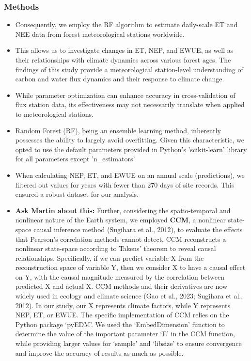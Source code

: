\documentclass[paper=a4, fontsize=12pt]{scrartcl}
\begin{document}
	\subsubsection{Methods}
	\begin{itemize}
		\item Consequently, we employ the RF algorithm to estimate daily-scale ET and NEE data from forest meteorological stations worldwide.
		\item This allows us to investigate changes in ET, NEP, and EWUE, as well as their relationships with climate dynamics across various forest ages. The findings of this study provide a meteorological station-level understanding of carbon and water flux dynamics and their response to climate change.
		\item While parameter optimization can enhance accuracy in cross-validation of flux station data, its effectiveness may not necessarily translate when applied to meteorological stations. 
		\item Random Forest (RF), being an ensemble learning method, inherently possesses the ability to largely avoid overfitting. Given this characteristic, we opted to use the default parameters provided in Python’s ’scikit-learn’ library for all parameters except ’n\_estimators’
		\item When calculating NEP, ET, and EWUE on an annual scale (predictions), we filtered out values for years with fewer than 270 days of site records. This ensured a robust dataset for our analysis.
		\item \textbf{Ask Martin about this:} Further, considering the spatio-temporal and nonlinear nature of the Earth system, we employed \textbf{CCM}, a nonlinear state-space causal inference method (Sugihara et al., 2012), to evaluate the effects that Pearson’s correlation methods cannot detect. CCM reconstructs a nonlinear state-space according to Takens’ theorem to reveal causal relationships. Specifically, if we can predict variable X from the reconstruction space of variable Y, then we consider X to have a causal effect on Y, with the causal magnitude measured by the correlation between predicted X and actual X. CCM methods and their derivatives are now widely used in ecology and climate science (Gao et al., 2023; Sugihara et al., 2012). In our study, our X represents climate factors, while Y represents NEP, ET, or EWUE. The specific implementation of CCM relies on the Python package ‘pyEDM’. We used the ‘EmbedDimension’ function to determine the value of the important parameter ‘E’ in the CCM function, while providing larger values for ‘sample’ and ‘libsize’ to ensure convergence and improve the accuracy of results as much as possible.
	\end{itemize}
	
\end{document}
